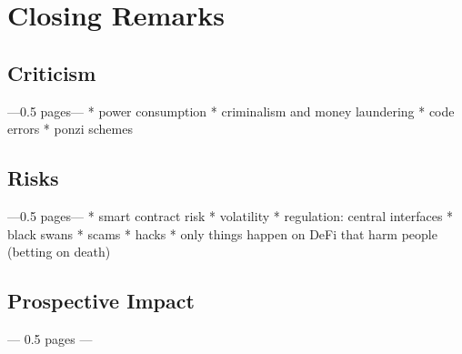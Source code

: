 \chapter{Closing Remarks}
\label{cha:ClosingRemarks}

\section{Criticism}
---0.5 pages---
* power consumption
* criminalism and money laundering
* code errors
* ponzi schemes

\section{Risks}
---0.5 pages---
* smart contract risk
* volatility
* regulation: central interfaces
* black swans
* scams
* hacks
* only things happen on DeFi that harm people (betting on death)

\section{Prospective Impact}
--- 0.5 pages ---